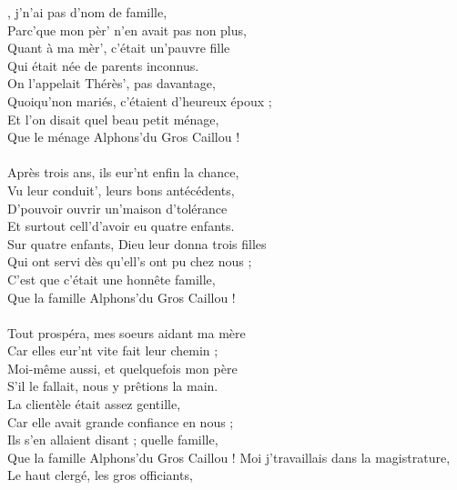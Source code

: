 
, j'n'ai pas d'nom de famille,
\\Parc'que mon pèr' n'en avait pas non plus,
\\Quant à ma mèr', c'était un'pauvre fille
\\Qui était née de parents inconnus.
\\On l'appelait Thérès', pas davantage,
\\Quoiqu'non mariés, c'étaient d'heureux époux ;
\\Et l'on disait quel beau petit ménage,
\\Que le ménage Alphons'du Gros Caillou !
\\\\Après trois ans, ils eur'nt enfin la chance,
\\Vu leur conduit', leurs bons antécédents,
\\D'pouvoir ouvrir un'maison d'tolérance
\\Et surtout cell'd'avoir eu quatre enfants.
\\Sur quatre enfants, Dieu leur donna trois filles
\\Qui ont servi dès qu'ell's ont pu chez nous ;
\\C'est que c'était une honnête famille,
\\Que la famille Alphons'du Gros Caillou !
\\\\Tout prospéra, mes soeurs aidant ma mère
\\Car elles eur'nt vite fait leur chemin ;
\\Moi-même aussi, et quelquefois mon père
\\S'il le fallait, nous y prêtions la main.
\\La clientèle était assez gentille,
\\Car elle avait grande confiance en nous ;
\\Ils s'en allaient disant ; quelle famille,
\\Que la famille Alphons'du Gros Caillou !
\breakpage
Moi j'travaillais dans la magistrature,
\\Le haut clergé, les gros officiants,
